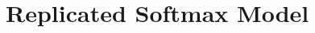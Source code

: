 \documentclass[a4paper,12pt,oneside,onecolumn,final,fleqn]{config/UERJ/repUERJ}
\begin{document}
%

\mainmatter



%

%



\chapter{Replicated Softmax Model}%
\label{appen:rsm}%


%



%

%


\end{document}
